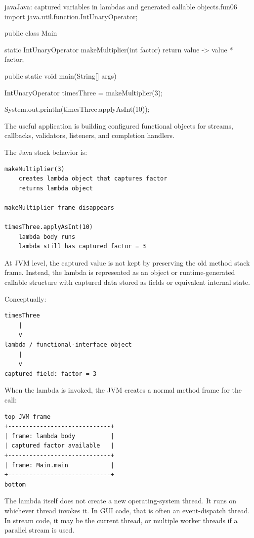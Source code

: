 \documentclass[a4paper,twoside]{report}
\begin{document}
\begin{codebox}[]{java}{Java: captured variables in lambdas and generated callable objects.}{fun06}
import java.util.function.IntUnaryOperator;

public class Main {
    static IntUnaryOperator makeMultiplier(int factor) {
        return value -> value * factor;
    }

    public static void main(String[] args) {
        IntUnaryOperator timesThree = makeMultiplier(3);

        System.out.println(timesThree.applyAsInt(10));
    }
}
\end{codebox}


The useful application is building configured functional objects for streams, callbacks, validators, listeners, and completion handlers.

The Java stack behavior is:

\begin{verbatim}
makeMultiplier(3)
    creates lambda object that captures factor
    returns lambda object

makeMultiplier frame disappears

timesThree.applyAsInt(10)
    lambda body runs
    lambda still has captured factor = 3
\end{verbatim}

At JVM level, the captured value is not kept by preserving the old method stack frame. Instead, the lambda is represented as an object or runtime-generated callable structure with captured data stored as fields or equivalent internal state.

Conceptually:

\begin{verbatim}
timesThree
    |
    v
lambda / functional-interface object
    |
    v
captured field: factor = 3
\end{verbatim}

When the lambda is invoked, the JVM creates a normal method frame for the call:

\begin{verbatim}
top JVM frame
+-----------------------------+
| frame: lambda body          |
| captured factor available   |
+-----------------------------+
| frame: Main.main            |
+-----------------------------+
bottom
\end{verbatim}

The lambda itself does not create a new operating-system thread. It runs on whichever thread invokes it. In GUI code, that is often an event-dispatch thread. In stream code, it may be the current thread, or multiple worker threads if a parallel stream is used.
\end{document}
